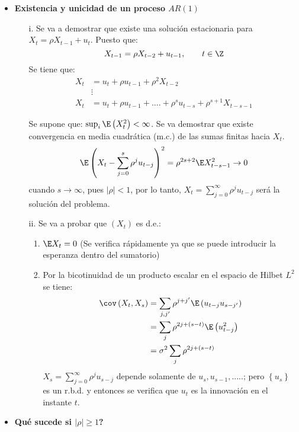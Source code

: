 \begin{itemize}
\item \textbf{Existencia y unicidad de un proceso $AR(1)$}
	\begin{enumerate}
	\item[i.] Se va a demostrar que existe una soluci\'{o}n estacionaria para $X_{t} =\rho X_{t-1} +u_{t} $. Puesto que:
	\[
		X_{t-1} =\rho X_{t-2} +u_{t-1}, \qquad t\in \Z
	\]
	Se tiene que:
	\begin{align*}
	X_{t} &=u_{t} +\rho u_{t-1} +\rho^{2}X_{t-2} \\ 
		 &\vdots \\ 
	X_{t} &=u_{t} +\rho u_{t-1} +....+\rho^{s}u_{t-s} +\rho^{s+1}X_{t-s-1}
	\end{align*}
	
	Se supone que: $\sup_i\E\left(X_{t}^{2} \right)<\infty$. Se va demostrar que existe convergencia en media cuadr\'{a}tica (m.c.) de las sumas finitas hacia $X_{t}$. 
	\[
	 \E\left( {X_{t} -\sum_{j=0}^s {\rho^{j}u_{t-j} } } \right)^{2}=\rho^{2s+2}\E X_{t-s-1}^{2} \to 0
	\]
	cuando $s\to \infty $, pues $\left| \rho \right|<1$, por lo tanto, $X_{t} =\sum_{j=0}^\infty {\rho^{j}u_{t-j} } $ ser\'{a} la soluci\'{o}n del problema.

	\item[ii.] Se va a probar que $\left( {X_{t} } \right)$ es d.e.:
	\begin{enumerate}
		\item $\E X_{t} =0$ (Se verifica r\'{a}pidamente ya que se puede introducir la esperanza dentro del sumatorio)
		\item Por la bicotinuidad de un producto escalar en el espacio de Hilbet $L^{2}$ se tiene: 
		\begin{align*}
		 \cov\left( {X_{t} ,X_{s} } \right)
			 &=\sum_{j,j'} {\rho^{j+j'}} \E\left( {u_{t-j} u_{s-j'} } \right)\\
			 &=\sum_j {\rho^{2j+\left( {s-t} \right)}\E\left( {u_{t-j}^{2} }\right)}\\ &=\sigma^{2}\sum_j {\rho^{2j+(s-t)}} 
		\end{align*}
		$\displaystyle X_{s} =\sum_{j=0}^\infty {\rho^{j}u_{s-j} } $ depende solamente de $u_{s} ,u_{s-1} ,.....$; pero $\left\{ {u_{s} } \right\}$ es un r.b.d. y entonces se verifica que $u_{t} $ es la innovaci\'{o}n en el instante $t.$
	\end{enumerate}
	\end{enumerate}

\item \textbf{Qu\'{e} sucede si $\left| \rho \right|\ge 1$?}


\end{itemize}
